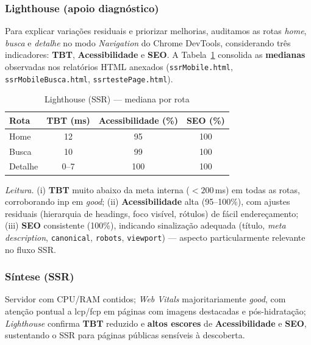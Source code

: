 \subsubsection*{Lighthouse (apoio diagnóstico)}
Para explicar variações residuais e priorizar melhorias, auditamos as rotas \emph{home}, \emph{busca} e \emph{detalhe} no modo \emph{Navigation} do Chrome DevTools, considerando três indicadores: \textbf{TBT}, \textbf{Acessibilidade} e \textbf{SEO}.
A Tabela~\ref{tab:lh-ssr} consolida as \textbf{medianas} observadas nos relatórios HTML anexados (\texttt{ssrMobile.html}, \texttt{ssrMobileBusca.html}, \texttt{ssrtestePage.html}).

\begin{table}[H]
\centering
\caption{Lighthouse (SSR) — mediana por rota}
\label{tab:lh-ssr}
\begin{tabular}{|l|c|c|c|}
\hline
\textbf{Rota} & \textbf{TBT (ms)} & \textbf{Acessibilidade (\%)} & \textbf{SEO (\%)} \\
\hline
Home    & 12 & 95  & 100 \\
Busca   & 10 & 99  & 100 \\
Detalhe & 0--7\footnotemark[1] & 100 & 100 \\
\hline
\end{tabular}
\end{table}

\noindent \textit{Leitura.}
(i) \textbf{TBT} muito abaixo da meta interna ($<200$\,ms) em todas as rotas, corroborando \acrshort{inp} em \textit{good};
(ii) \textbf{Acessibilidade} alta (95--100\%), com ajustes residuais (hierarquia de headings, foco visível, rótulos) de fácil endereçamento;
(iii) \textbf{SEO} consistente (100\%), indicando sinalização adequada (título, \emph{meta description}, \texttt{canonical}, \texttt{robots}, \texttt{viewport}) — aspecto particularmente relevante no fluxo SSR.

\subsubsection*{Síntese (SSR)}
Servidor com CPU/RAM contidos; \emph{Web Vitals} majoritariamente \textit{good}, com atenção pontual a \acrshort{lcp}/\acrshort{fcp} em páginas com imagens destacadas e pós-hidratação; \emph{Lighthouse} confirma \textbf{TBT} reduzido e \textbf{altos escores} de \textbf{Acessibilidade} e \textbf{SEO}, sustentando o SSR para páginas públicas sensíveis à descoberta.




